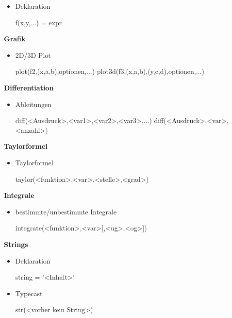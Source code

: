 \documentclass[a4paper,9pt,DIV15,twocolumn]{scrartcl}
\begin{document}
\begin{itemize}
 \item Deklaration
\begin{sagein}
f(x,y,...) = expr
\end{sagein}
\end{itemize}
\bigskip
\bigskip
\textbf{Grafik}
\begin{itemize}
\item 2D/3D Plot
\begin{sagein}
plot(f2,(x,a,b),optionen,...)
plot3d(f3,(x,a,b),(y,c,d),optionen,...)
\end{sagein}
\end{itemize}

\textbf{Differentiation}
\begin{itemize}
 \item Ableitungen
\begin{sagein}
diff(<Ausdruck>,<var1>,<var2>,<var3>,...)
diff(<Ausdruck>,<var>,<anzahl>) 
\end{sagein}
\end{itemize}

\textbf{Taylorformel}
\begin{itemize}
 \item Taylorformel
\begin{sagein}
taylor(<funktion>,<var>,<stelle>,<grad>)
\end{sagein}
\end{itemize}

\textbf{Integrale}
\begin{itemize}
\item bestimmte/unbestimmte Integrale
\begin{sagein}
integrate(<funktion>,<var>[,<ug>,<og>]) 
\end{sagein}
\end{itemize}

\textbf{Strings}

\begin{itemize}
 \item Deklaration
\begin{sagein}
string = '<Inhalt>'
\end{sagein}
\item Typecast
\begin{sagein}
str(<vorher kein String>)
\end{sagein}
\end{itemize}
\end{document}
